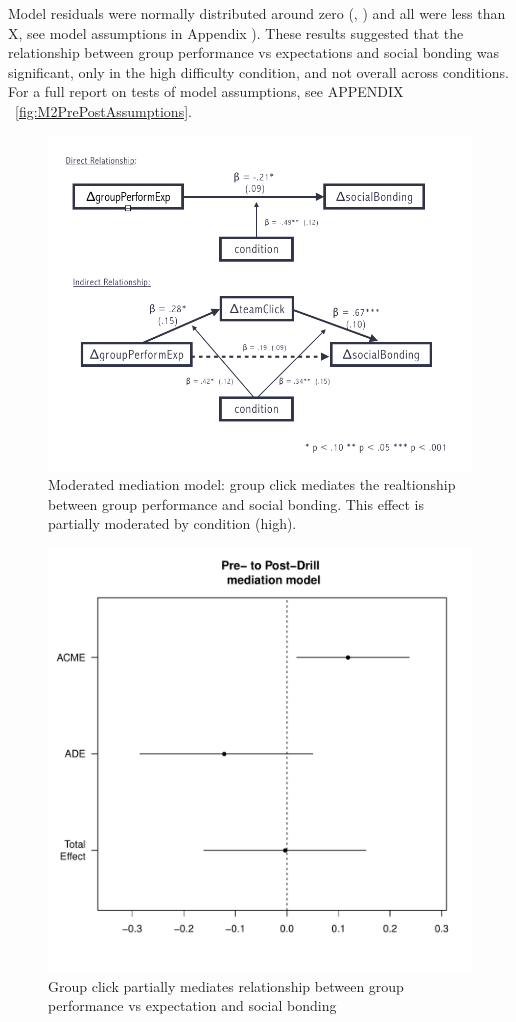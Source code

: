 Model residuals were normally distributed around zero (\resdist , \pvalue ) and all \cooksD were less than X, see model assumptions in Appendix  ).  These results suggested that the relationship between  group performance vs expectations and social bonding was significant, only in the high difficulty condition, and not overall across conditions. For a full report on tests of model assumptions, see APPENDIX ~\ref{fig:M2PrePostAssumptions}.











\begin{figure}
  \centering
  \includegraphics[width=0.9\linewidth,keepaspectratio] {images/prePostExperimentChangeModMedFigure}
  \caption{Moderated mediation model: group click mediates the realtionship between group performance and social bonding.  This effect is partially moderated by condition (high).}
  \label{fig:prePostExperimentChangeModMedFigure}
\end{figure}



\begin{figure}
  \centering
  \includegraphics[width=0.5\linewidth,keepaspectratio] {images/groupPerfExpClickChangeMedPlot}
  \caption{Group click partially mediates relationship between group performance vs expectation and social bonding}
  \label{fig:groupPerfExpClickChangeMedPlot}
\end{figure}

